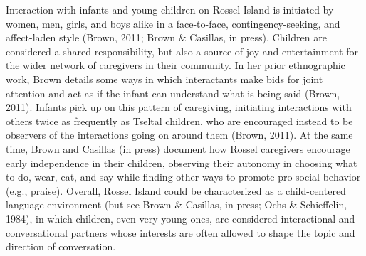 \documentclass[,man,floatsintext]{apa6}
\begin{document}
Interaction with infants and young children on Rossel Island is
initiated by women, men, girls, and boys alike in a face-to-face,
contingency-seeking, and affect-laden style (Brown, 2011; Brown \&
Casillas, in press). Children are considered a shared responsibility,
but also a source of joy and entertainment for the wider network of
caregivers in their community. In her prior ethnographic work, Brown
details some ways in which interactants make bids for joint attention
and act as if the infant can understand what is being said (Brown,
2011). Infants pick up on this pattern of caregiving, initiating
interactions with others twice as frequently as Tseltal children, who
are encouraged instead to be observers of the interactions going on
around them (Brown, 2011). At the same time, Brown and Casillas (in
press) document how Rossel caregivers encourage early independence in
their children, observing their autonomy in choosing what to do, wear,
eat, and say while finding other ways to promote pro-social behavior
(e.g., praise). Overall, Rossel Island could be characterized as a
child-centered language environment (but see Brown \& Casillas, in
press; Ochs \& Schieffelin, 1984), in which children, even very young
ones, are considered interactional and conversational partners whose
interests are often allowed to shape the topic and direction of
conversation.
\end{document}

